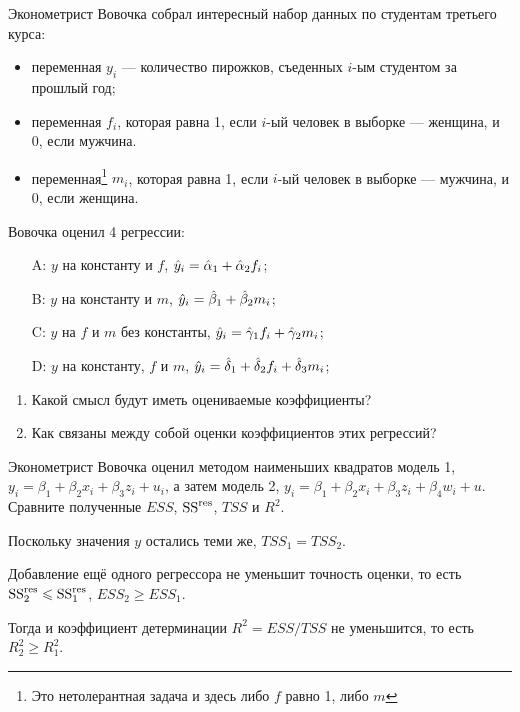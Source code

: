 \begin{problem}

Эконометрист Вовочка собрал интересный набор данных по студентам третьего курса:
\begin{itemize}
\item переменная $y_i$ — количество пирожков, съеденных $i$-ым студентом за прошлый год;
\item переменная $f_i$, которая равна 1, если $i$-ый человек в выборке — женщина, и 0, если мужчина.
\item переменная\footnote{Это нетолерантная задача и здесь либо $f$ равно 1, либо $m$} $m_i$, которая равна 1, если $i$-ый человек в выборке — мужчина, и 0, если женщина.
\end{itemize}

Вовочка оценил 4 регрессии:
\begin{enumerate}
\item[A:] $y$ на константу и $f$, $\hat{y}_i = \hat \alpha_1 + \hat \alpha_2 f_i$;
\item[B:] $y$ на константу и $m$, $\hat{y}_i = \hat{\beta}_1 + \hat{\beta}_2 m_i$;
\item[C:] $y$ на $f$ и $m$ без константы, $\hat{y}_i = \hat \gamma_1 f_i + \hat \gamma_2 m_i$;
\item[D:] $y$ на константу, $f$ и $m$, $\hat{y}_i = \hat \delta_1 + \hat \delta_2 f_i + \hat \delta_3 m_i$;
\end{enumerate}

\begin{enumerate}
\item Какой смысл будут иметь оцениваемые коэффициенты?
\item Как связаны между собой оценки коэффициентов этих регрессий?
\end{enumerate}


\begin{sol}
\end{sol}
\end{problem}


\begin{problem}
Эконометрист Вовочка оценил методом наименьших квадратов модель 1, $y_i=\beta_1+\beta_2 x_i+\beta_3 z_i+u_i$,
а затем модель 2, $y_i=\beta_1+\beta_2 x_i+\beta_3 z_i+\beta_4 w_i+u$.
Сравните полученные $ESS$, $\mathrm{SS}^{\text{res}}$, $TSS$ и $R^2$.

\begin{sol}
Поскольку значения $y$ остались теми же, $TSS_1 = TSS_2$.

Добавление ещё одного регрессора не уменьшит точность оценки, то есть
$\mathrm{SS}^{\text{res}}_2 \leqslant \mathrm{SS}^{\text{res}}_1$, $ESS_2 \geq ESS_1$.

Тогда и коэффициент детерминации $R^2 = ESS / TSS$ не уменьшится, то есть
$R^2_2 \geq R^2_1$.
\end{sol}
\end{problem}

